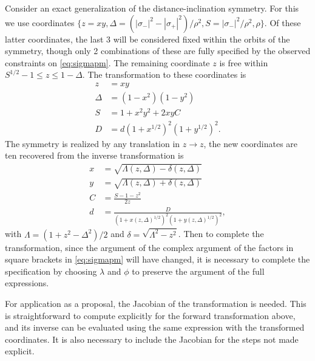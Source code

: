 \documentclass[aps,showpacs,12pt,onecolumn,prd,superscriptaddress,nofootinbib]{revtex4}
\begin{document}
Consider an exact generalization of the distance-inclination symmetry. For this we use coordinates $\{z=xy,\Delta=(|\sigma_-|^2-|\sigma_+|^2)/\rho^2,S=|\sigma_-|^2/\rho^2,\rho\}$.  Of these latter coordinates, the last 3 will be considered fixed within the orbits of the symmetry, though only 2 combinations of these are fully specified by the observed constraints on \eqref{eq:sigmapm}. The remaining coordinate $z$ is free within $S^{1/2}-1\leq z\leq 1-\Delta$. The transformation to these coordinates is
\begin{align}
  z&=xy\\
  \Delta&=(1-x^2)(1-y^2)\\
  S&=1+x^2y^2+2xyC\\
  D&=d(1+x^{1/2})^2(1+y^{1/2})^2.
\end{align}
The symmetry is realized by any translation in $z\rightarrow z$, the new coordinates are ten recovered from the inverse transformation is 
\begin{align}
  x&=\sqrt{\Lambda(z,\Delta)-\delta(z,\Delta)}\\
  y&=\sqrt{\Lambda(z,\Delta)+\delta(z,\Delta)}\\
  C&=\frac{S-1-z^2}{2z}\\
  d&=\frac D{(1+x(z,\Delta)^{1/2})^2(1+y(z,\Delta)^{1/2})^2},
\end{align}
with $\Lambda=(1+z^2-\Delta^2)/2$ and $\delta=\sqrt{\Lambda^2-z^2}$.
Then to complete the transformation, since the argument of the complex argument of the factors in square brackets in \eqref{eq:sigmapm} will have changed, it is necessary to complete the specification by choosing $\lambda$ and $\phi$ to preserve the argument of the full expressions.

For application as a proposal, the Jacobian of the transformation is needed.  This is straightforward to compute explicitly for the forward transformation above, and its inverse can be evaluated using the same expression with the transformed coordinates.  It is also necessary to include the Jacobian for the steps not made explicit.
\end{document}
